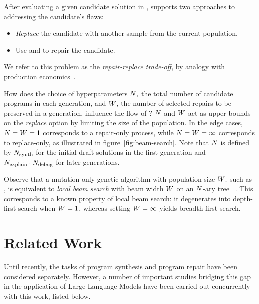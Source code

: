 After evaluating a given candidate solution in \execute{}, \method{} supports two approaches to addressing the candidate's flaws:
\begin{itemize}
  \item \emph{Replace} the candidate with another sample from the current population.
  \item Use \instruct{} and \debug{} to repair the candidate.
\end{itemize}
We refer to this problem as the \emph{repair-replace trade-off}, by analogy with production economics~\cite{jack2000:optimal}. 

How does the choice of hyperparameters $N{},$ the total number of candidate programs in each generation, and $W{},$ the number of selected repairs to be preserved in a generation, influence the flow of \method{}?
$N$ and $W{}$ act as upper bounds on the \emph{replace} option by limiting the size of the population.
In the edge cases, $N{} = W{} = 1$ corresponds to a repair-only process, while $N{} = W{} = \infty$ corresponds to replace-only, as illustrated in figure~\ref{fig:beam-search}. 
Note that $N{}$ is defined by $N_\text{synth}{}$ for the initial draft solutions in the first generation and $N_\text{explain}{} \cdot N_\text{debug}{}$ for later generations. 

Observe that a mutation-only genetic algorithm with population size $W{},$ such as \method{}, is equivalent to \emph{local beam search} with beam width $W{}$ on an $N{}$-ary tree ~\cite[Section 4.1.4]{russell2010:artificial}. This corresponds to a known property of local beam search: it degenerates into depth-first search when $W{} = 1$, whereas setting $W{} = \infty$ yields breadth-first search.


\section{Related Work}
\label{sec:related-work}

Until recently, the tasks of program synthesis \cite{gulwaniProgramSynthesis2017} and program repair \cite{gouesAutomatedProgramRepair2019, petke2018:genetic} have been considered separately.
However, a number of important studies bridging this gap in the application of Large Language Models have been carried out concurrently with this work, listed below.

